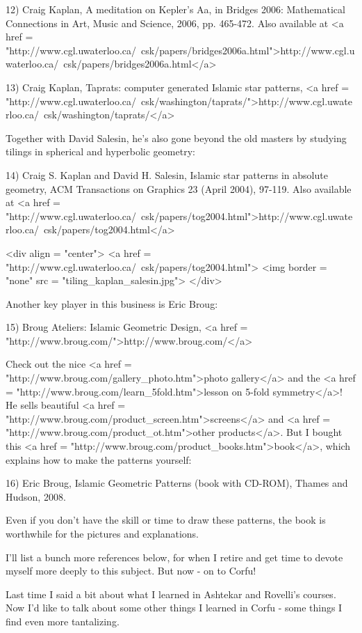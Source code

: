 12) Craig Kaplan, A meditation on Kepler's Aa, in Bridges 2006: 
Mathematical Connections in Art, Music and Science, 2006, pp. 465-472.
Also available at <a href = "http://www.cgl.uwaterloo.ca/~csk/papers/bridges2006a.html">http://www.cgl.uwaterloo.ca/~csk/papers/bridges2006a.html</a>

13) Craig Kaplan, Taprats: computer generated Islamic star 
patterns, <a href = "http://www.cgl.uwaterloo.ca/~csk/washington/taprats/">http://www.cgl.uwaterloo.ca/~csk/washington/taprats/</a>

Together with David Salesin, he's also gone beyond the old masters by
studying tilings in spherical and hyperbolic geometry:

14) Craig S. Kaplan and David H. Salesin, Islamic star patterns in 
absolute geometry, ACM Transactions on Graphics 23 (April 2004),
97-119.  Also available at 
<a href = "http://www.cgl.uwaterloo.ca/~csk/papers/tog2004.html">http://www.cgl.uwaterloo.ca/~csk/papers/tog2004.html</a>

<div align = "center">
<a href = "http://www.cgl.uwaterloo.ca/~csk/papers/tog2004.html">
<img border = "none" src = "tiling_kaplan_salesin.jpg">
</div>

Another key player in this business is Eric Broug:

15) Broug Ateliers: Islamic Geometric Design, <a href =
"http://www.broug.com/">http://www.broug.com/</a>

Check out the nice <a href =
"http://www.broug.com/gallery_photo.htm">photo gallery</a> and the <a
href = "http://www.broug.com/learn_5fold.htm">lesson on 5-fold
symmetry</a>!  He sells beautiful <a href =
"http://www.broug.com/product_screen.htm">screens</a> and <a href =
"http://www.broug.com/product_ot.htm">other products</a>.  But I
bought this <a href =
"http://www.broug.com/product_books.htm">book</a>, which explains how
to make the patterns yourself:

16) Eric Broug, Islamic Geometric Patterns (book with CD-ROM), Thames
and Hudson, 2008.

Even if you don't have the skill or time to draw these patterns, the
book is worthwhile for the pictures and explanations.

I'll list a bunch more references below, for when I retire and get
time to devote myself more deeply to this subject.  But now - on to
Corfu!

Last time I said a bit about what I learned in Ashtekar and Rovelli's
courses.  Now I'd like to talk about some other things I learned in
Corfu - some things I find even more tantalizing.

